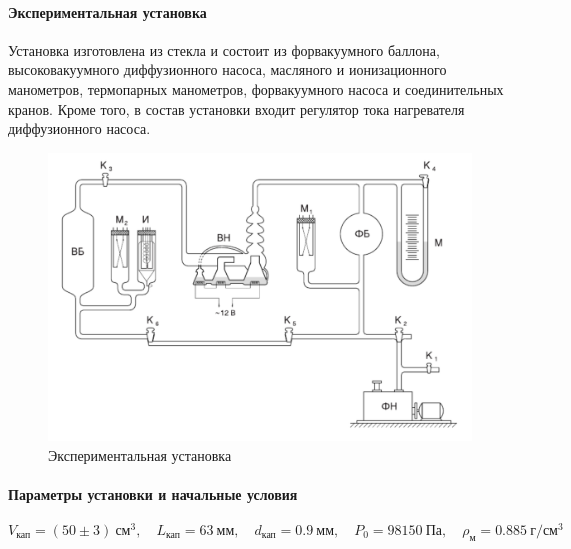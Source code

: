 \documentclass{letnab}
\begin{document}
\paragraph{Экспериментальная установка} Установка изготовлена из стекла и состоит из форвакуумного баллона, высоковакуумного диффузионного насоса, масляного и ионизационного манометров, термопарных манометров, форвакуумного насоса и соединительных кранов. Кроме того, в состав установки входит регулятор тока нагревателя диффузионного насоса.
\begin{figure}[H]
	\includegraphics[width = 150mm]{apparatus.png}
	\caption{Экспериментальная установка}
\end{figure}
\paragraph{Параметры установки и начальные условия}
$$ V_\text{кап} = (50 \pm 3)~\text{см}^3, \quad
L_\text{кап} = 63~\text{мм}, \quad
d_\text{кап} = 0.9~\text{мм}, \quad
P_0 = 98 150~\text{Па}, \quad
\rho_\text{м} = 0.885~\text{г}/\text{см}^3 $$
\end{document}
